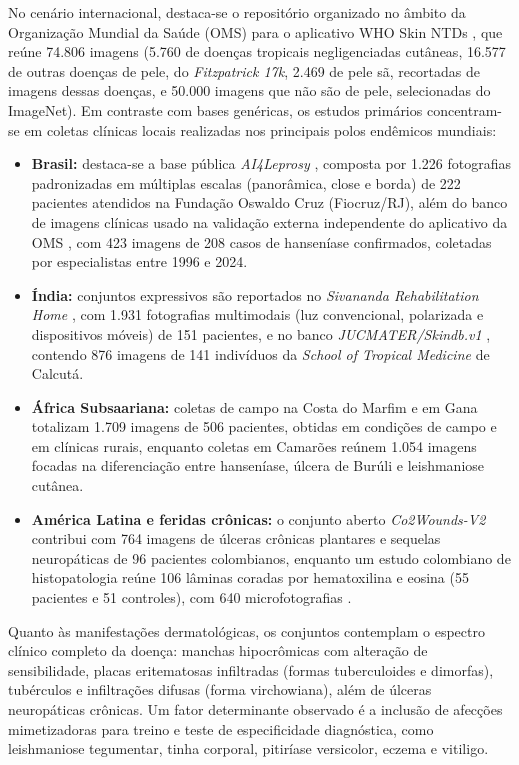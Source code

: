 No cenário internacional, destaca-se o repositório organizado no âmbito da Organização
Mundial da Saúde (OMS) para o aplicativo WHO Skin NTDs , que reúne 74.806
imagens (5.760 de doenças tropicais negligenciadas cutâneas, 16.577 de outras doenças de pele,
do \textit{Fitzpatrick 17k}, 2.469 de pele sã, recortadas de imagens dessas doenças, e 50.000
imagens que não são de pele, selecionadas do ImageNet).
Em contraste com bases genéricas, os estudos primários concentram-se em coletas clínicas
locais realizadas nos principais polos endêmicos mundiais:
\begin{itemize}
    \item \textbf{Brasil:} destaca-se a base pública \textit{AI4Leprosy} ,
    composta por 1.226 fotografias padronizadas em múltiplas escalas (panorâmica, close e borda)
    de 222 pacientes atendidos na Fundação Oswaldo Cruz (Fiocruz/RJ), além do banco de imagens
    clínicas usado na validação externa independente do aplicativo da OMS , com
    423 imagens de 208 casos de hanseníase confirmados, coletadas por especialistas entre 1996 e 2024.
    \item \textbf{Índia:} conjuntos expressivos são reportados no \textit{Sivananda Rehabilitation Home}
    , com 1.931 fotografias multimodais (luz convencional, polarizada e dispositivos
    móveis) de 151 pacientes, e no banco \textit{JUCMATER/Skindb.v1} , contendo
    876 imagens de 141 indivíduos da \textit{School of Tropical Medicine} de Calcutá.
    \item \textbf{África Subsaariana:} coletas de campo na Costa do Marfim e em Gana 
    totalizam 1.709 imagens de 506 pacientes, obtidas em condições de campo e em clínicas rurais, enquanto coletas em
    Camarões  reúnem 1.054 imagens focadas na diferenciação entre hanseníase,
    úlcera de Burúli e leishmaniose cutânea.
    \item \textbf{América Latina e feridas crônicas:} o conjunto aberto \textit{Co2Wounds-V2}
     contribui com 764 imagens de úlceras crônicas plantares e
    sequelas neuropáticas de 96 pacientes colombianos, enquanto um estudo colombiano de histopatologia
    reúne 106 lâminas coradas por hematoxilina e eosina (55 pacientes e 51 controles), com 640 microfotografias
    .
\end{itemize}

Quanto às manifestações dermatológicas, os conjuntos contemplam o espectro clínico completo da
doença: manchas hipocrômicas com alteração de sensibilidade, placas eritematosas infiltradas
(formas tuberculoides e dimorfas), tubérculos e infiltrações difusas (forma virchowiana), além
de úlceras neuropáticas crônicas. Um fator determinante observado é a inclusão de afecções
mimetizadoras para treino e teste de especificidade diagnóstica, como leishmaniose tegumentar,
tinha corporal, pitiríase versicolor, eczema e vitiligo.

